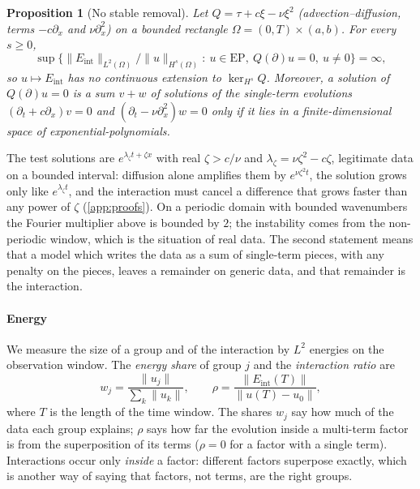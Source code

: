 \documentclass[11pt]{article}
\theoremstyle{plain}
\newtheorem{proposition}[theorem]{Proposition}
\theoremstyle{definition}
\theoremstyle{remark}
\newcommand{\EP}{\mathrm{EP}}               %
\newcommand{\Eint}{E_{\mathrm{int}}}        %
\newcommand{\Hs}{H^{s}}                     %
\newcommand{\norm}[1]{\lVert#1\rVert}
\begin{document}
\begin{proposition}[No stable removal]\label{prop:discont}
Let $Q=\tau+c\xi-\nu\xi^2$ (advection--diffusion, terms $-c\partial_x$ and $\nu\partial_x^2$) on a bounded
rectangle $\Omega=(0,T)\times(a,b)$. For every $s\ge0$,
\[
  \sup\Big\{\norm{\Eint}_{L^2(\Omega)}/\norm{u}_{\Hs(\Omega)}:\ u\in\EP,\ Q(\partial)u=0,\ u\ne0\Big\}=\infty,
\]
so $u\mapsto\Eint$ has no continuous extension to $\ker_{\Hs}Q$. Moreover, a solution of $Q(\partial)u=0$ is a
sum $v+w$ of solutions of the single-term evolutions $(\partial_t+c\partial_x)v=0$ and $(\partial_t-\nu\partial_x^2)w=0$ only
if it lies in a finite-dimensional space of exponential-polynomials.
\end{proposition}

The test solutions are $e^{\lambda_\zeta t+\zeta x}$ with real $\zeta>c/\nu$ and $\lambda_\zeta=\nu\zeta^2-c\zeta$, legitimate
data on a bounded interval: diffusion alone amplifies them by $e^{\nu\zeta^2t}$, the solution grows only like
$e^{\lambda_\zeta t}$, and the interaction must cancel a difference that grows faster than any power of $\zeta$
(\cref{app:proofs}). On a periodic domain with bounded wavenumbers the Fourier multiplier above is bounded by
$2$; the instability comes from the non-periodic window, which is the situation of real data. The second
statement means that a model which writes the data as a sum of single-term pieces, with any penalty on the
pieces, leaves a remainder on generic data, and that remainder is the interaction.

\paragraph{Energy}
We measure the size of a group and of the interaction by $L^2$ energies on the observation window.
The \emph{energy share} of group $j$ and the \emph{interaction ratio} are
\begin{equation}\label{eq:energy}
  w_j=\frac{\norm{u_j}}{\sum_k\norm{u_k}},\qquad
  \rho=\frac{\norm{\Eint(T)}}{\norm{u(T)-u_0}} ,
\end{equation}
where $T$ is the length of the time window. The shares $w_j$ say how much of the data each group
explains; $\rho$ says how far the evolution inside a multi-term factor is from the superposition of its
terms ($\rho=0$ for a factor with a single term). Interactions occur only \emph{inside} a factor:
different factors superpose exactly, which is another way of saying that factors, not terms, are the
right groups.
\end{document}
